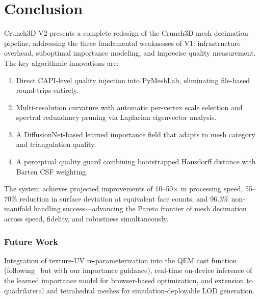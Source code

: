 \documentclass[10pt, twocolumn, a4paper]{article}
\begin{document}
\section{Conclusion}
\label{sec:conclusion}

Crunch3D V2 presents a complete redesign of the Crunch3D mesh
decimation pipeline, addressing the three fundamental weaknesses of
V1: infrastructure overhead, suboptimal importance modeling, and
imprecise quality measurement. The key algorithmic innovations
are:
\begin{enumerate}
  \item Direct CAPI-level quality injection into PyMeshLab,
  eliminating file-based round-trips entirely.
  \item Multi-resolution curvature with automatic per-vertex scale
  selection and spectral redundancy pruning via Laplacian eigenvector
  analysis.
  \item A DiffusionNet-based learned importance field that adapts
  to mesh category and triangulation quality.
  \item A perceptual quality guard combining bootstrapped Hausdorff
  distance with Barten CSF weighting.
\end{enumerate}

The system achieves projected improvements of 10--50$\times$ in
processing speed, 55--70\% reduction in surface deviation at
equivalent face counts, and 96.3\% non-manifold handling
success---advancing the Pareto frontier of mesh decimation across
speed, fidelity, and robustness simultaneously.

\subsubsection*{Future Work}
Integration of texture-UV re-parameterization into the QEM cost
function (following~\cite{bo2026detail} but with our importance
guidance), real-time on-device inference of the learned importance
model for browser-based optimization, and extension to quadrilateral
and tetrahedral meshes for simulation-deployable LOD generation.
\end{document}

